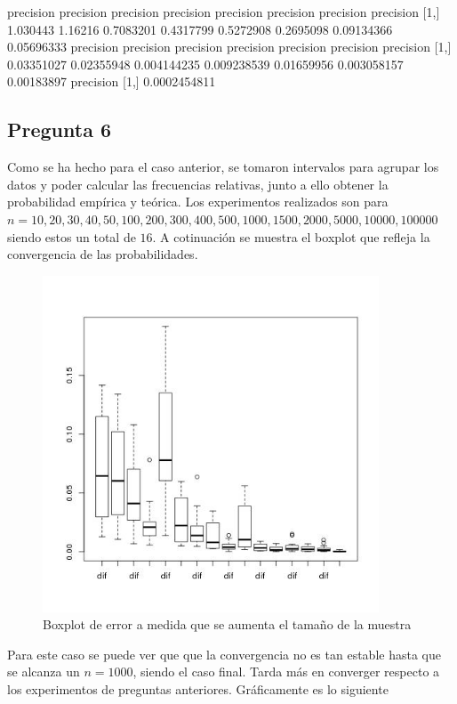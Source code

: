 \documentclass[letter,10pt]{article}
\begin{document}
\begin{itemize}
     precision precision precision precision precision precision  precision  precision
[1,]  1.030443   1.16216 0.7083201 0.4317799 0.5272908 0.2695098 0.09134366 0.05696333
      precision  precision   precision   precision  precision   precision  precision
[1,] 0.03351027 0.02355948 0.004144235 0.009238539 0.01659956 0.003058157 0.00183897
        precision
[1,] 0.0002454811
      
 
\end{itemize}

\subsection{Pregunta 6}

Como se ha hecho para el caso anterior, se tomaron intervalos para agrupar los datos y poder calcular
las frecuencias relativas, junto a ello obtener la probabilidad empírica y teórica. Los experimentos
realizados son para $n=10,20,30,40,50,100,200,300,400,500,1000,1500,2000,5000,10000,100000$ siendo estos un total de $16$. A cotinuación se muestra
el boxplot que refleja la convergencia de las probabilidades. 

       \begin{figure}[H]
	      \centering
              \includegraphics[width=100mm, scale=0.3]{p6_boxplot_dif.jpg}
              \caption{Boxplot de error a medida que se aumenta el tamaño de la muestra}
          \end{figure}

Para este caso se puede ver que que la convergencia no es tan estable hasta que se alcanza un $n=1000$, siendo el caso final.
Tarda más en converger respecto a los experimentos de preguntas anteriores. Gráficamente es lo siguiente
\end{document}
